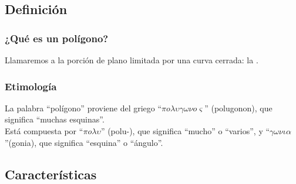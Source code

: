 \documentclass[14pt]{beamer}
\begin{document}
\subsection{Definición}

\begin{frame}
\frametitle{¿Qué es un polígono?}
Llamaremos  a la porción de plano limitada por una curva cerrada: la .
\end{frame}
\begin{frame}
\frametitle{Etimología}
La palabra \enquote{polígono} proviene del griego \enquote{$\pi o \lambda \upsilon \gamma \omega \nu o \varsigma $} (polugonon), que significa \enquote{muchas esquinas}.
\\
\bigskip
\pause
Está compuesta por \enquote{$\pi o \lambda \upsilon $} (polu-), que significa \enquote{mucho} o \enquote{varios}, \pause y \enquote{$\gamma \omega \nu \iota \alpha $}(gonia), que significa \enquote{esquina} o \enquote{ángulo}.
\end{frame}

\subsection{Características}
\end{document}
